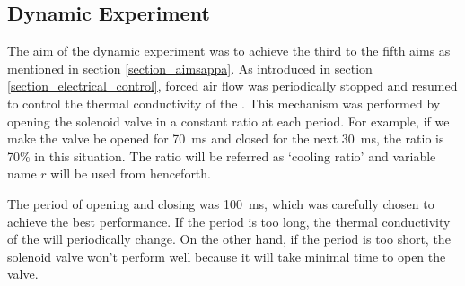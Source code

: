 \subsection{Dynamic Experiment}\label{section_dynamic} %
The aim of the dynamic experiment was to achieve the third to the fifth aims as mentioned in section \ref{section_aimsappa}.
As introduced in section \ref{section_electrical_control}, forced air flow was periodically stopped and resumed to control the thermal conductivity of the \scpnospace.
This mechanism was performed by opening the solenoid valve in a constant ratio at each period. For example, if we make the valve be opened for \SI{70}{\milli\second} and closed for the next \SI{30}{\milli\second}, the ratio is 70\% in this situation. 
The ratio will be referred as `cooling ratio' and variable name $r$ will be used from henceforth.
 
%

The period of opening and closing was \SI{100}{\milli\second}, which was carefully chosen to achieve the best performance. If the period is too long, the thermal conductivity of the \scps will periodically change. On the other hand, if the period is too short, the solenoid valve won't perform well because it will take minimal time to open the valve. 

